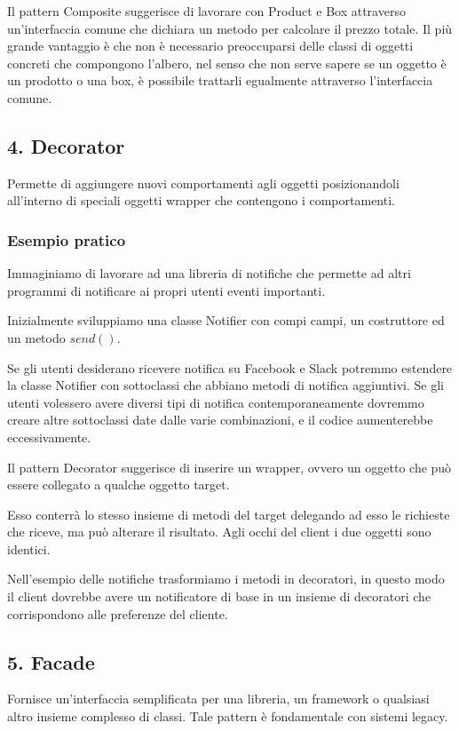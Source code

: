 \documentclass{report}
\begin{document}
\medskip
\noindent
Il pattern Composite suggerisce di lavorare con Product e Box attraverso un'interfaccia comune che dichiara un metodo per calcolare il prezzo totale. Il più grande vantaggio è che non è necessario preoccuparsi delle classi di oggetti concreti che compongono l'albero, nel senso che non serve sapere se un oggetto è un prodotto o una box, è possibile trattarli egualmente attraverso l'interfaccia comune.

\subsection*{4. Decorator}
Permette di aggiungere nuovi comportamenti agli oggetti posizionandoli all'interno di speciali oggetti wrapper che contengono i comportamenti.

\subsubsection*{Esempio pratico}
Immaginiamo di lavorare ad una libreria di notifiche che permette ad altri programmi di notificare ai propri utenti eventi importanti.

\noindent
Inizialmente sviluppiamo una classe Notifier con compi campi, un costruttore ed un metodo $send()$.

\smallskip
\noindent
Se gli utenti desiderano ricevere notifica su Facebook e Slack potremmo estendere la classe Notifier con sottoclassi che abbiano metodi di notifica aggiuntivi. Se gli utenti volessero avere diversi tipi di notifica contemporaneamente dovremmo creare altre sottoclassi date dalle varie combinazioni, e il codice aumenterebbe eccessivamente.

\newpage
\noindent
Il pattern Decorator suggerisce di inserire un wrapper, ovvero un oggetto che può essere collegato a qualche oggetto target.

\noindent
Esso conterrà lo stesso insieme di metodi del target delegando ad esso le richieste che riceve, ma può alterare il risultato. Agli occhi del client i due oggetti sono identici.

\medskip
\noindent
Nell'esempio delle notifiche trasformiamo i metodi in decoratori, in questo modo il client dovrebbe avere un notificatore di base in un insieme di decoratori che corrispondono alle preferenze del cliente.

\subsection*{5. Facade}
Fornisce un'interfaccia semplificata per una libreria, un framework o qualsiasi altro insieme complesso di classi. Tale pattern è fondamentale con sistemi legacy.
\end{document}
